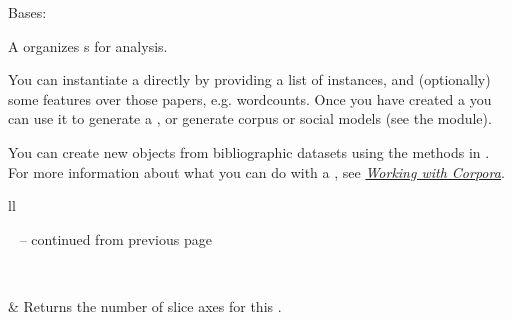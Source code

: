 \documentclass[letterpaper,10pt,english]{sphinxmanual}
\begin{document}
\begin{fulllineitems}
\label{tethne.classes.corpus:tethne.classes.corpus.Corpus}
Bases: 

A {\hyperref[tethne.classes.corpus:tethne.classes.corpus.Corpus]{}} organizes {\hyperref[tethne.classes.paper:tethne.classes.paper.Paper]{}}s for analysis.

You can instantiate a {\hyperref[tethne.classes.corpus:tethne.classes.corpus.Corpus]{}} directly by providing a list of
{\hyperref[tethne.classes.paper:tethne.classes.paper.Paper]{}} instances, and (optionally) some features over those papers,
e.g. wordcounts. Once you have created a {\hyperref[tethne.classes.corpus:tethne.classes.corpus.Corpus]{}} you can use it
to generate a {\hyperref[tethne.classes.graphcollection:tethne.classes.graphcollection.GraphCollection]{}}, or generate corpus or social
models (see the {\hyperref[tethne.model:module-tethne.model]{}} module).

You can create new {\hyperref[tethne.classes.corpus:tethne.classes.corpus.Corpus]{}} objects from bibliographic datasets
using the methods in {\hyperref[tethne.readers:module-tethne.readers]{}}. For more information about what you
can do with a {\hyperref[tethne.classes.corpus:tethne.classes.corpus.Corpus]{}}, see {\hyperref[corpora:working-with-corpora]{\emph{Working with Corpora}}}.

\begin{longtable}{ll}
\hline
\endfirsthead

%
{{\textsf{\tablename\ \thetable{} -- continued from previous page}}} \\
\hline
\endhead

\hline {} \\ \hline
\endfoot

\endlastfoot


{\hyperref[tethne.classes.corpus:tethne.classes.corpus.Corpus.N_axes]{}}
 & 
Returns the number of slice axes for this {\hyperref[tethne.classes.corpus:tethne.classes.corpus.Corpus]{}}.
\\


\end{longtable}
\end{fulllineitems}
\end{document}
